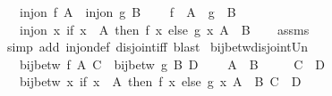 \begin{isabellebody}
\ \ \ {\isachardoublequoteopen}inj{\isacharunderscore}{\kern0pt}on\ f\ A{\isachardoublequoteclose}\ \ {\isachardoublequoteopen}inj{\isacharunderscore}{\kern0pt}on\ g\ B{\isachardoublequoteclose}\ \isanewline
\ \ \ {\isachardoublequoteopen}f\ {\isacharbackquote}{\kern0pt}\ A\ {\isasyminter}\ g\ {\isacharbackquote}{\kern0pt}\ B\ {\isacharequal}{\kern0pt}\ {\isacharbraceleft}{\kern0pt}{\isacharbraceright}{\kern0pt}{\isachardoublequoteclose}\isanewline
\ \ \ {\isachardoublequoteopen}inj{\isacharunderscore}{\kern0pt}on\ {\isacharparenleft}{\kern0pt}{\isasymlambda}x{\isachardot}{\kern0pt}\ if\ x\ {\isasymin}\ A\ then\ f\ x\ else\ g\ x{\isacharparenright}{\kern0pt}\ {\isacharparenleft}{\kern0pt}A\ {\isasymunion}\ B{\isacharparenright}{\kern0pt}{\isachardoublequoteclose}\isanewline
%
\isadelimproof
\ \ %
\endisadelimproof
%
\isatagproof
{}\isamarkupfalse%
\ assms\ \isamarkupfalse%
\ {\isacharparenleft}{\kern0pt}simp\ add{\isacharcolon}{\kern0pt}\ inj{\isacharunderscore}{\kern0pt}on{\isacharunderscore}{\kern0pt}def\ disjoint{\isacharunderscore}{\kern0pt}iff{\isacharparenright}{\kern0pt}\ {\isacharparenleft}{\kern0pt}blast{\isacharparenright}{\kern0pt}%
\endisatagproof
{\isafoldproof}%
%
\isadelimproof
\isanewline
%
\endisadelimproof
\isanewline
{}\isamarkupfalse%
\ bij{\isacharunderscore}{\kern0pt}betw{\isacharunderscore}{\kern0pt}disjoint{\isacharunderscore}{\kern0pt}Un{\isacharcolon}{\kern0pt}\isanewline
\ \ \ {\isachardoublequoteopen}bij{\isacharunderscore}{\kern0pt}betw\ f\ A\ C{\isachardoublequoteclose}\ \ {\isachardoublequoteopen}bij{\isacharunderscore}{\kern0pt}betw\ g\ B\ D{\isachardoublequoteclose}\ \isanewline
\ \ \ {\isachardoublequoteopen}A\ {\isasyminter}\ B\ {\isacharequal}{\kern0pt}\ {\isacharbraceleft}{\kern0pt}{\isacharbraceright}{\kern0pt}{\isachardoublequoteclose}\isanewline
\ \ \ {\isachardoublequoteopen}C\ {\isasyminter}\ D\ {\isacharequal}{\kern0pt}\ {\isacharbraceleft}{\kern0pt}{\isacharbraceright}{\kern0pt}{\isachardoublequoteclose}\isanewline
\ \ \ {\isachardoublequoteopen}bij{\isacharunderscore}{\kern0pt}betw\ {\isacharparenleft}{\kern0pt}{\isasymlambda}x{\isachardot}{\kern0pt}\ if\ x\ {\isasymin}\ A\ then\ f\ x\ else\ g\ x{\isacharparenright}{\kern0pt}\ {\isacharparenleft}{\kern0pt}A\ {\isasymunion}\ B{\isacharparenright}{\kern0pt}\ {\isacharparenleft}{\kern0pt}C\ {\isasymunion}\ D{\isacharparenright}{\kern0pt}{\isachardoublequoteclose}\isanewline

\end{isabellebody}
